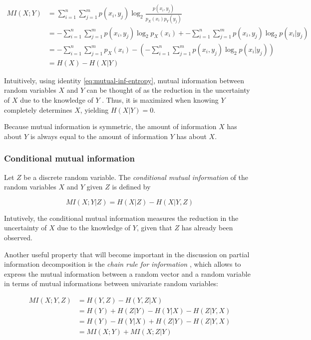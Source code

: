 \documentclass[12pt]{article}
\begin{document}
\begin{equation}
\begin{split}
MI(X;Y) & = \sum_{i=1}^n \sum_{j=1}^m p(x_i,y_j) \log_2 \frac{p(x_i,y_j)}{p_X(x_i)p_Y(y_j)} \\
 		& = -\sum_{i=1}^n \sum_{j=1}^m p(x_i,y_j) \log_2 p_X(x_i) + -\sum_{i=1}^n \sum_{j=1}^m p(x_i,y_j) \log_2 p(x_i|y_j) \\
 		& = -\sum_{i=1}^n \sum_{j=1}^m p_X(x_i) - \left( - \sum_{i=1}^n \sum_{j=1}^m p(x_i,y_j) \log_2 p(x_i|y_j) \right) \\ 
 		& = H(X) - H(X|Y)
\label{eq:mutual-inf-entropy} 
\end{split}
\end{equation}

Intuitively, using identity \ref{eq:mutual-inf-entropy}, mutual information between random variables $X$ and $Y$ can be thought of as the reduction in the uncertainty of $X$ due to the knowledge of $Y$ \cite{cover-thomas}. Thus, it is maximized when knowing $Y$ completely determines $X$, yielding $H(X|Y) = 0$. 

Because mutual information is symmetric, the amount of information $X$ has about $Y$ is always equal to the amount of information $Y$ has about $X$. 

\subsubsection{Conditional mutual information}

Let $Z$ be a discrete random variable. The \textit{conditional mutual information} \cite{cover-thomas} of the random variables $X$ and $Y$ given $Z$ is defined by 

\begin{equation}
MI(X;Y|Z) = H(X|Z) - H(X|Y,Z)
\end{equation}

Intutively, the conditional mutual information measures the reduction in the uncertainty of $X$ due to the knowledge of $Y$, given that $Z$ has already been observed. 

Another useful property that will become important in the discussion on partial information decomposition is the \textit{chain rule for information} \cite{cover-thomas}, which allows to express the mutual information between a random vector and a random variable in terms of mutual informations between univariate random variables:

\begin{equation}
\begin{split}
MI(X;Y,Z) & = H(Y,Z) - H(Y,Z|X) \\ 
		  & = H(Y) + H(Z|Y) - H(Y|X) - H(Z|Y,X) \\ 
		  & = H(Y) - H(Y|X) + H(Z|Y) - H(Z|Y,X) \\ 
		  & = MI(X;Y) + MI(X;Z|Y)
\label{eq:chain-rule-inf}
\end{split}
\end{equation}
\end{document}
